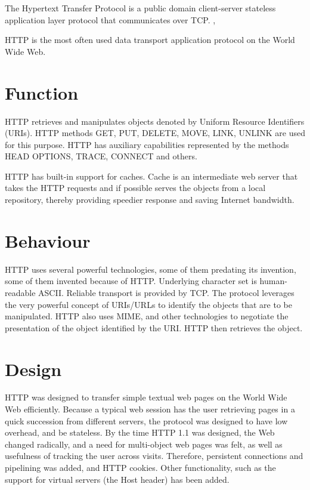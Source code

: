 \documentclass[10pt]{report}
\begin{document}
The Hypertext Transfer Protocol is a public domain client-server
stateless application layer protocol that communicates over TCP.
\cite{rfc1945,rfc2616},
\cite[pp122--124]{kurose}

HTTP is the most often used data transport application protocol on the
World Wide Web.

\section{Function}

HTTP retrieves and manipulates objects denoted by Uniform Resource Identifiers
(URIs).  \cite{stallings} HTTP methods GET, PUT, DELETE, MOVE, LINK, UNLINK are
used for this purpose.  HTTP has auxiliary capabilities represented by the
methods HEAD OPTIONS, TRACE, CONNECT and others.

HTTP has built-in support for caches.  Cache is an intermediate web server that
takes the HTTP requests and if possible serves the objects from a local
repository, thereby providing speedier response and saving Internet bandwidth.

\section{Behaviour}

HTTP uses several powerful technologies, some of them predating its invention,
some of them invented because of HTTP.  Underlying character set is
human-readable ASCII.  Reliable transport is provided by TCP.  The protocol
leverages the very powerful concept of URIs/URLs \cite{rfc1738} to identify the
objects that are to be manipulated.  HTTP also uses MIME, and other technologies
to negotiate the presentation of the object identified by the URI.\cite{rfc2616}
HTTP then retrieves the object.

\section{Design}

HTTP was designed to transfer simple textual web pages on the World Wide Web
efficiently.  Because a typical web session has the user retrieving pages in a
quick succession from different servers, the protocol was designed to have low
overhead, and be stateless.  By the time HTTP 1.1 was designed, the Web changed
radically, and a need for multi-object web pages was felt, as well as usefulness
of tracking the user across visits.  Therefore, persistent connections and
pipelining was added, and HTTP cookies.  Other functionality, such as the
support for virtual servers (the Host header) has been added.
\end{document}
